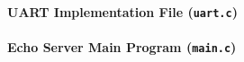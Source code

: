 
\smallskip
\paragraph{UART Implementation File (\texttt{uart.c})} \hfill


\smallskip
\paragraph{Echo Server Main Program (\texttt{main.c})} \hfill


\pagestyle{plain} %

